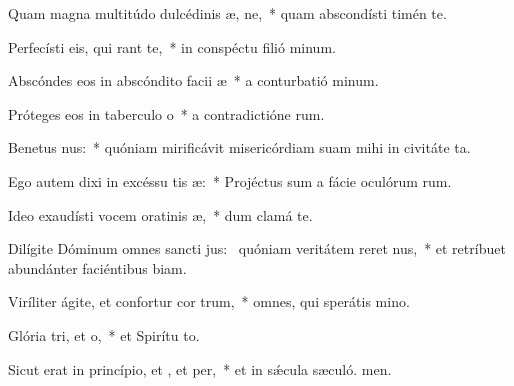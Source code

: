 \item Quam magna multitúdo dulcédinis æ, ne,~* quam abscondísti timén te.
\item Perfecísti eis, qui rant  te,~* in conspéctu filió minum.
\item Abscóndes eos in abscóndito facii æ~* a conturbatió minum.
\item Próteges eos in taberculo o~* a contradictióne rum.
\item Benetus nus:~* quóniam mirificávit misericórdiam suam mihi in civitáte ta.
\item Ego autem dixi in excéssu tis æ:~* Projéctus sum a fácie oculórum rum.
\item Ideo exaudísti vocem oratinis æ,~* dum clamá  te.
\item Dilígite Dóminum omnes sancti jus:~\pscross{} quóniam veritátem reret nus,~* et retríbuet abundánter faciéntibus biam.
\item Viríliter ágite, et confortur cor trum,~* omnes, qui sperátis  mino.
\item Glória tri, et o,~* et Spirítu to.
\item Sicut erat in princípio, et , et per,~* et in sǽcula sæculó. men.
